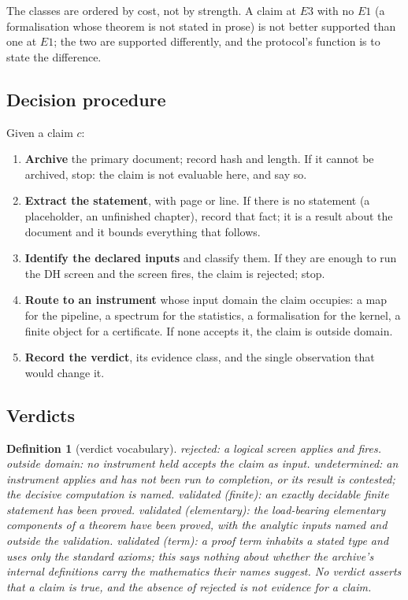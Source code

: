 \documentclass[11pt,a4paper]{article}
\newtheorem{definition}{Definition}
\newcommand{\verdict}[1]{\textsf{#1}}
\begin{document}
The classes are ordered by cost, not by strength. A claim at $E3$ with no $E1$ (a
formalisation whose theorem is not stated in prose) is not better supported than one at $E1$; the
two are supported differently, and the protocol's function is to state the difference.

\subsection{Decision procedure}

Given a claim $c$:
\begin{enumerate}
\item \textbf{Archive} the primary document; record hash and length. If it cannot be archived,
  stop: the claim is not evaluable here, and say so.
\item \textbf{Extract the statement}, with page or line. If there is no statement (a
  placeholder, an unfinished chapter), record that fact; it is a result about the document and
  it bounds everything that follows.
\item \textbf{Identify the declared inputs} and classify them. If they are enough to run the DH
  screen and the screen fires, the claim is \verdict{rejected}; stop.
\item \textbf{Route to an instrument} whose input domain the claim occupies: a map for the
  pipeline, a spectrum for the statistics, a formalisation for the kernel, a finite object for a
  certificate. If none accepts it, the claim is \verdict{outside domain}.
\item \textbf{Record the verdict}, its evidence class, and the single observation that would
  change it.
\end{enumerate}

\subsection{Verdicts}
\label{def:verdicts}

\begin{definition}[verdict vocabulary]
\verdict{rejected}: a logical screen applies and fires. \verdict{outside domain}: no instrument
held accepts the claim as input. \verdict{undetermined}: an instrument applies and has not been
run to completion, or its result is contested; the decisive computation is named.
\verdict{validated (finite)}: an exactly decidable finite statement has been proved.
\verdict{validated (elementary)}: the load-bearing elementary components of a theorem have been
proved, with the analytic inputs named and outside the validation.
\verdict{validated (term)}: a proof term inhabits a stated type and uses only the standard
axioms; this says nothing about whether the archive's internal definitions carry the
mathematics their names suggest. No verdict asserts that a claim is true, and the absence of
\verdict{rejected} is not evidence for a claim.
\end{definition}
\end{document}
